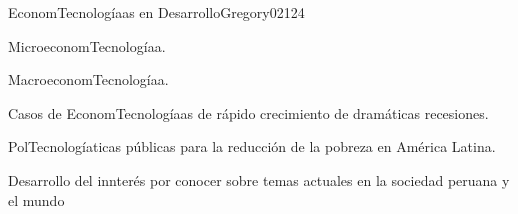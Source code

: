 \begin{syllabus}
\begin{unit}{EconomTecnologíaas en Desarrollo}{}{Gregory02}{12}{4}
   \begin{topics}
      \item MicroeconomTecnologíaa.
      \item MacroeconomTecnologíaa.
      \item Casos de EconomTecnologíaas de rápido crecimiento de dramáticas recesiones.
      \item PolTecnologíaticas públicas para la reducción de la pobreza en América Latina.
   \end{topics}
   \begin{learningoutcomes}
      \item Desarrollo del innterés por conocer sobre temas actuales en la sociedad peruana y el mundo
   \end{learningoutcomes}
\end{unit}

\begin{coursebibliography}
\end{coursebibliography}

\end{syllabus}
